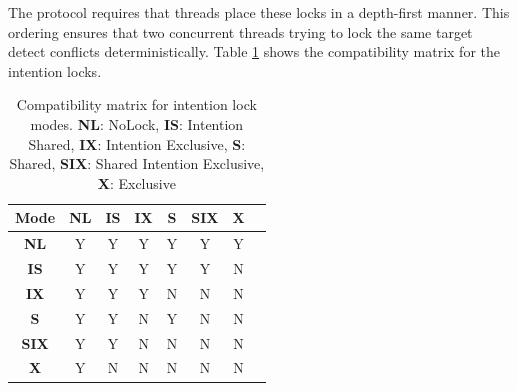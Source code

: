 The protocol requires that threads place these locks in a depth-first manner. This ordering ensures that two concurrent threads trying to lock the same target detect conflicts deterministically. Table \ref{tab:intention_locks} shows the compatibility matrix for the intention locks.




\begin{table}[h]
    \centering
    \captionsetup{justification=centering}
    \begin{tabular}{c|ccccccc}
        \textbf{Mode} & \textbf{NL} & \textbf{IS} & \textbf{IX} & \textbf{S} & \textbf{SIX} & \textbf{X}\\
        \hline
        \textbf{NL} & \cellcolor{green!25} Y & \cellcolor{green!25} Y & \cellcolor{green!25} Y & \cellcolor{green!25} Y & \cellcolor{green!25} Y & \cellcolor{green!25} Y \\
        \textbf{IS} &  \cellcolor{green!25} Y & \cellcolor{green!25} Y & \cellcolor{green!25} Y & \cellcolor{green!25} Y & \cellcolor{green!25} Y & \cellcolor{red!25} N \\
        \textbf{IX} &  \cellcolor{green!25} Y & \cellcolor{green!25} Y & \cellcolor{green!25} Y & \cellcolor{red!25} N & \cellcolor{red!25} N & \cellcolor{red!25} N \\
        \textbf{S} &  \cellcolor{green!25} Y & \cellcolor{green!25} Y & \cellcolor{red!25} N & \cellcolor{green!25} Y & \cellcolor{red!25} N & \cellcolor{red!25} N \\
        \textbf{SIX} &  \cellcolor{green!25} Y & \cellcolor{green!25} Y & \cellcolor{red!25} N & \cellcolor{red!25} N & \cellcolor{red!25} N & \cellcolor{red!25} N \\
        \textbf{X} &  \cellcolor{green!25} Y & \cellcolor{red!25} N & \cellcolor{red!25} N & \cellcolor{red!25} N & \cellcolor{red!25} N & \cellcolor{red!25} N \\
    \end{tabular}
    \caption{Compatibility matrix for intention lock modes. \textbf{NL}: NoLock, \textbf{IS}: Intention Shared, \textbf{IX}: Intention Exclusive, \textbf{S}: Shared, \textbf{SIX}: Shared Intention Exclusive, \textbf{X}: Exclusive}
    \label{tab:intention_locks}
\end{table}



